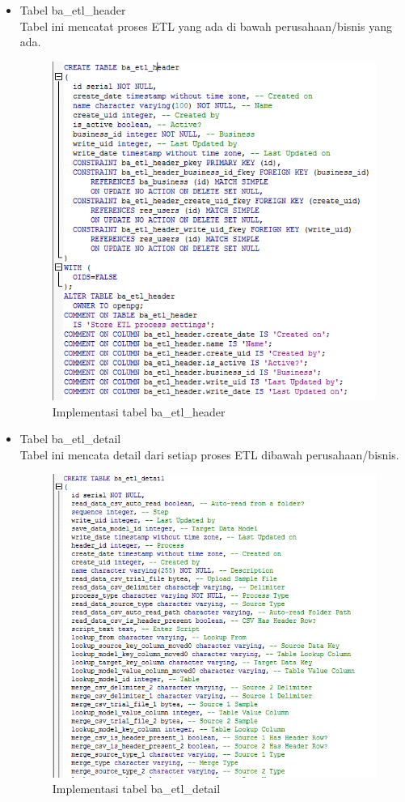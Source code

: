\begin{itemize}
	\item Tabel ba\_etl\_header\\
	Tabel ini mencatat proses ETL yang ada di bawah perusahaan/bisnis yang ada.
	\begin{figure}[H]
	\centering
	\includegraphics[scale=0.5]{Gambar/tabel-ba-etl-header}
	\caption{Implementasi tabel ba\_etl\_header}
	\end{figure}
	
	\item Tabel ba\_etl\_detail\\
	Tabel ini mencata detail dari setiap proses ETL dibawah perusahaan/bisnis. 
	\begin{figure}[H]
	\centering
	\includegraphics[scale=0.5]{Gambar/tabel-ba-etl-detail}
	\caption{Implementasi tabel ba\_etl\_detail}
	\end{figure}
	

\end{itemize}
